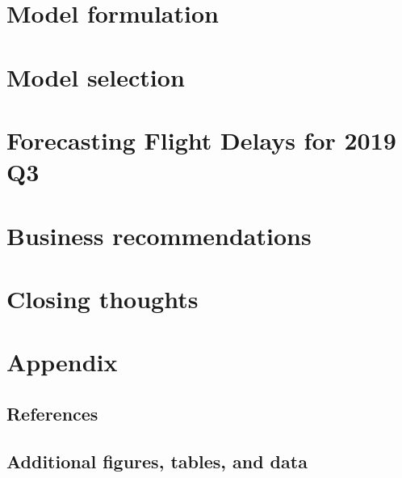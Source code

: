 \documentclass[12pt, a4paper]{book}
\begin{document}
\chapter{Model formulation}
\chapter{Model selection}
\chapter{Forecasting Flight Delays for 2019 Q3}
\chapter{Business recommendations}
\chapter{Closing thoughts}
\chapter{Appendix}
	\section{References}
	\section{Additional figures, tables, and data}
\pagebreak


\nocite{*}

\end{document}
